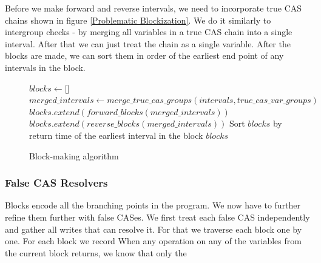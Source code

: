 \documentclass[oneside, a4paper, onecolumn, 10pt]{article}
\begin{document}
\noindent
Before we make forward and reverse intervals, we need to incorporate true CAS chains shown in figure \ref{Problematic Blockization}. We do it similarly to intergroup checks - by merging all variables in a true CAS chain into a single interval. After that we can just treat the chain as a single variable. After the blocks are made, we can sort them in order of the earliest end point of any intervals in the block.
\begin{figure}[h]
  \begin{algorithmic}
    \State $blocks \gets \texttt{[]}$
    \State {}
    \State $merged\_intervals \gets merge\_true\_cas\_groups(intervals, true\_cas\_var\_groups)$
    \State
    \State {}
    \State {}
    \State $blocks.extend(forward\_blocks(merged\_intervals))$
    \State
    \State {}
    \State $blocks.extend(reverse\_blocks(merged\_intervals))$
    \State
    \State Sort $blocks$ by return time of the earliest interval in the block
    \State \Return $blocks$

    \EndFunction
  \end{algorithmic}
  \caption{Block-making algorithm}
\end{figure}
\subsubsection{False CAS Resolvers}
Blocks encode all the branching points in the program. We now have to further refine them further with false CASes. We first treat each false CAS independently and gather all writes that can resolve it. For that we traverse each block one by one. For each block we record  When any operation on any of the variables from the current block returns, we know that only the 
\end{document}
